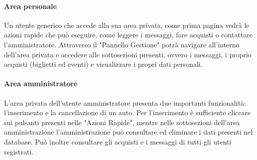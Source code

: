             \paragraph{Area personale} Un utente generico che accede alla sua area privata, come prima pagina vedrà le azioni rapide che può eseguire, come leggere i messaggi, fare acquisti o contattare l'amministratore. Attraverso il "Pannello Gestione" potrà navigare all'interno dell'area privata e accedere alle sottosezioni presenti, ovvero i messaggi, i proprio acquisti (biglietti ed eventi) e visualizzare i propri dati personali.
            \paragraph{Area amministratore} L'area privata dell'utente amministratore presenta due importanti funzionalità: l'inserimento e la cancellazione di un auto. Per l'inserimento è sufficiente cliccare sui pulsanti presenti nelle "Azioni Rapide", mentre nelle sottosezioni dell'area amministrazione l'amministrazione può consultare ed eliminare i dati presenti nel database. Può inoltre consultare gli acquisti e i messaggi di tutti gli utenti registrati.

        
\pagebreak
